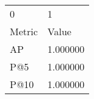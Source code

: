 \begin{tabular}{ll}
0 & 1 \\
Metric & Value \\
AP & 1.000000 \\
P@5 & 1.000000 \\
P@10 & 1.000000 \\
\end{tabular}
